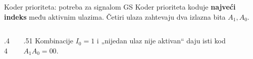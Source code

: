 \begin{frame}[label=03-s016]{Koder prioriteta: potreba za signalom GS}
Koder prioriteta koduje \textbf{najveći indeks} među aktivnim ulazima. Četiri ulaza zahtevaju dva izlazna bita \(A_1,A_0\).
\par\vspace{2mm}
\begin{columns}[T,onlytextwidth]
\begin{column}{.44\textwidth}\centering
{}
\vspace{2mm}

\end{column}
\begin{column}{.51\textwidth}
Kombinacije \(I_0=1\) i „nijedan ulaz nije aktivan“ daju isti kod \textcolor{DEisticanje}{\(A_1A_0=00\)}.
\par\vspace{3mm}
\end{column}
\end{columns}
\end{frame}
